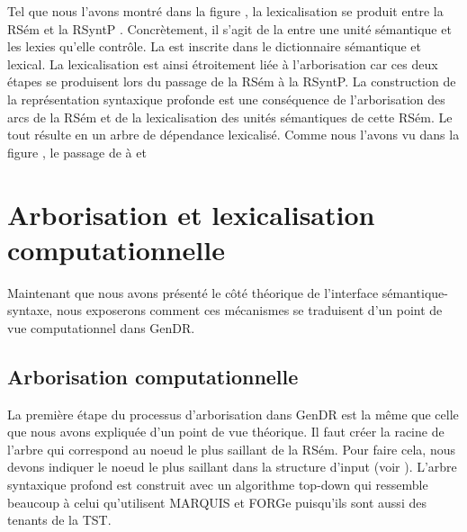 Tel que nous l'avons montré dans la figure , la lexicalisation se produit entre la RSém et la RSyntP \citep{PolguereStructurationmisejeu1990}. Concrètement, il s'agit de la  entre une unité sémantique et les lexies qu'elle contrôle. La  est inscrite dans le dictionnaire sémantique et lexical. La lexicalisation est ainsi étroitement liée à l'arborisation car ces deux étapes se produisent lors du passage de la RSém à la RSyntP. La construction de la représentation syntaxique profonde est une conséquence de l'arborisation des arcs de la RSém et de la lexicalisation des unités sémantiques de cette RSém. Le tout résulte en un arbre de dépendance lexicalisé. Comme nous l'avons vu dans la figure , le passage de  à  et  


\section{Arborisation et lexicalisation computationnelle}\label{secarbolex}

Maintenant que nous avons présenté le côté théorique de l'interface sémantique-syntaxe, nous exposerons comment ces mécanismes se traduisent d'un point de vue computationnel dans GenDR.

\subsection{Arborisation computationnelle}
La première étape du processus d'arborisation dans GenDR est la même que celle que nous avons expliquée d'un point de vue théorique. Il faut créer la racine de l'arbre qui correspond au noeud le plus saillant de la RSém. Pour faire cela, nous devons indiquer le noeud le plus saillant dans la structure d'input (voir ). L'arbre syntaxique profond est construit avec un algorithme top-down qui ressemble beaucoup à celui qu'utilisent MARQUIS et FORGe puisqu'ils sont aussi des tenants de la TST.

